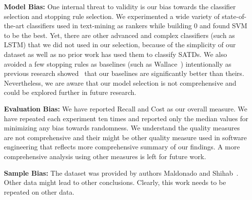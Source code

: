 \documentclass[10pt,conference]{IEEEtran}
\begin{document}
\textbf{Model Bias:} One internal threat to validity is our bias towards the classifier selection and stopping rule selection. 
We experimented a wide variety of state-of-the-art classifiers used in text-mining as rankers while building {\IT}0 and found SVM to be the best. 
Yet, there are other advanced and complex classifiers (such as LSTM) that we did not used in our selection, because of the simplicity of our dataset as well as no prior work has used them to classify SATDs. 
We also avoided a few stopping rules as baselines (such as Wallace~\cite{wallace2013active}) intentionally as previous research showed~\cite{yu2017fast} that our baselines are significantly better than theirs.
Nevertheless, we
 are aware that our model selection is not comprehensive and could be explored further in future research.

\textbf{Evaluation Bias:} We have reported Recall and Cost as our overall measure.
We have repeated each experiment ten times and reported only the median values for minimizing any bias towards randomness. 
We understand the quality measures are not comprehensive and their might be other quality measure used in software engineering that reflects more comprehensive summary of our findings. 
A more comprehensive analysis using other measures is left for future work. 

\textbf{Sample Bias:} The dataset was provided by authors Maldonado and Shihab~\cite{maldonado2015detecting}. Other data might lead
to other conclusions. Clearly, this work needs to be repeated
on other data.



\end{document}
